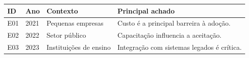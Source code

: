 \begin{quadro}[htb]
	\centering
	\caption{Síntese dos estudos incluídos (exemplo).}
	\label{qua_estudos}
	\small
	\begin{tabularx}{\textwidth}{|l|l|X|X|}
		\hline
		\textbf{ID} & \textbf{Ano} & \textbf{Contexto} & \textbf{Principal achado} \\ \hline
		E01 & 2021 & Pequenas empresas & Custo é a principal barreira à adoção. \\ \hline
		E02 & 2022 & Setor público & Capacitação influencia a aceitação. \\ \hline
		E03 & 2023 & Instituições de ensino & Integração com sistemas legados é crítica. \\ \hline
	\end{tabularx}
\end{quadro}
